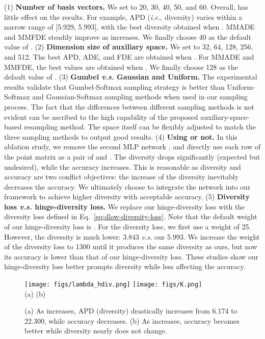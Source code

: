 \documentclass[sigconf,screen,nonacm]{acmart}
\begin{document}
	(1) \textbf{Number of basis vectors.} We set  to 20, 30, 40, 50, and 60. Overall,  has little effect on the results. For example, APD (\textit{i.e.}, diversity) varies within a narrow range of [5.929, 5.993], with the best diversity obtained when . MMADE and MMFDE steadily improve as  increases. We finally choose 40 as the default value of .
	(2) \textbf{Dimension size of auxiliary space.} We set  to 32, 64, 128, 256, and 512. The best APD, ADE, and FDE are obtained when . For MMADE and MMFDE, the best values are obtained when . We finally choose 128 as the default value of .
	(3) \textbf{Gumbel \textit{v.s.} Gaussian and Uniform.} The experimental results validate that Gumbel-Softmax sampling strategy is better than Uniform-Softmax and Gaussian-Softmax sampling methods when used in our sampling process. The fact that the differences between different sampling methods is not evident can be ascribed to the high capability of the proposed auxiliary-space-based resampling method. The space itself can be flexibly adjusted to match the three sampling methods to output good results. (4) \textbf{Using  or not.} In this ablation study, we remove the second MLP network , and directly use each row of the point matrix as a pair of  and . The diversity drops significantly (expected but undesired), while the accuracy increases. This is reasonable as diversity and accuracy are two conflict objectives: the increase of the diversity inevitably decreases the accuracy. We ultimately choose to integrate the network into our framework to achieve higher diversity with acceptable accuracy.
	(5) \textbf{Diversity loss \textit{v.s.} hinge-diversity loss.} We replace our hinge-diversity loss with the diversity loss defined in Eq.~\ref{eq:dlow-diversity-loss}. Note that the default weight of our hinge-diversity loss is . For the diversity loss, we first use a weight of 25. However, the diversity is much lower: 3.843 \textit{v.s.} our 5.993. We increase the weight of the diversity loss to 1300 until it produces the same diversity as ours, but now its accuracy is lower than that of our hinge-diversity loss. These studies show our hinge-diversity loss better prompts diversity while less affecting the accuracy.
	




	
	\begin{figure}[!t]
		\centering
		\texttt{[image: figs/lambda\_hdiv.png]}
		\hspace{0.1cm}
		\texttt{[image: figs/K.png]} \\
		\flushleft \hspace{2cm} (a) \hspace{3.5cm} (b)
		\caption{(a) As  increases, APD (diversity) drastically increases from 6.174 to 22.300, while accuracy decreases. (b) As  increases, accuracy becomes better while diversity nearly does not change.}
		\label{fig:two_curves}
	\end{figure}
	
\end{document}
